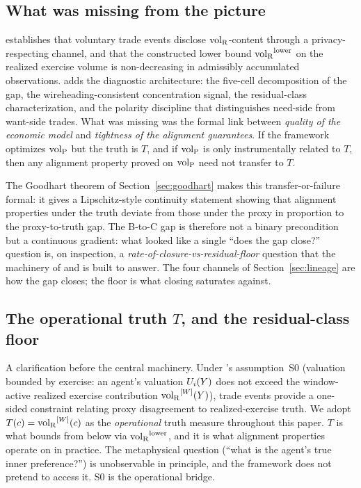 \subsection{What was missing from the picture}
\label{sec:whats_missing}

\citep[Revealed~Sacrifice]{lasser2026paper8a} establishes that
voluntary trade events disclose ${\operatorname{vol}_{\mathrm{R}}}$-content through a
privacy-respecting channel, and that the constructed lower bound
${\operatorname{vol}_{\mathrm{R}}}^{\mathrm{lower}}$ on the realized exercise volume is non-decreasing in
admissibly accumulated observations.
\citep[Need~Sufficiency]{lasser2026paper8b} adds the diagnostic
architecture: the five-cell decomposition of the gap, the
wireheading-consistent concentration signal, the residual-class
characterization, and the polarity discipline that distinguishes
need-side from want-side trades.  What was missing was the formal
link between \emph{quality of the economic model} and
\emph{tightness of the alignment guarantees}.  If the framework
optimizes ${\operatorname{vol}_{\mathrm{P}}}$ but the truth is $T$, and if ${\operatorname{vol}_{\mathrm{P}}}$ is only
instrumentally related to $T$, then any alignment property proved
on ${\operatorname{vol}_{\mathrm{P}}}$ need not transfer to $T$.

The Goodhart theorem of Section~\ref{sec:goodhart} makes this
transfer-or-failure formal: it gives a Lipschitz-style continuity
statement showing that alignment properties under the truth
deviate from those under the proxy in proportion to the
proxy-to-truth gap.  The B-to-C gap is therefore not a binary
precondition but a continuous gradient: what looked like a single
``does the gap close?'' question is, on inspection, a
\emph{rate-of-closure-vs-residual-floor} question that the
machinery of \citep[Revealed~Sacrifice]{lasser2026paper8a} and
\citep[Need~Sufficiency]{lasser2026paper8b} is built to answer.
The four channels of Section~\ref{sec:lineage} are how the gap
closes; the floor is what closing saturates against.

\subsection{The operational truth $T$, and the residual-class floor}
\label{sec:operational_truth}

A clarification before the central machinery.  Under
\citep[Revealed~Sacrifice]{lasser2026paper8a}'s assumption~S0
(valuation bounded by exercise: an agent's valuation $U_i(Y)$
does not exceed the window-active realized exercise contribution
${\operatorname{vol}_{\mathrm{R}}}^{[W]}(Y)$), trade events provide a one-sided constraint
relating proxy disagreement to realized-exercise truth.  We adopt
$T(c) = {\operatorname{vol}_{\mathrm{R}}}^{[W]}(c)$ as the \emph{operational} truth measure
throughout this paper.  $T$ is what
\citep[Theorem~2]{lasser2026paper8a} bounds from below via
${\operatorname{vol}_{\mathrm{R}}}^{\mathrm{lower}}$, and it is what alignment properties operate on in
practice.  The metaphysical question (``what is the agent's true
inner preference?'') is unobservable in principle, and the
framework does not pretend to access it.  S0 is the operational
bridge.

